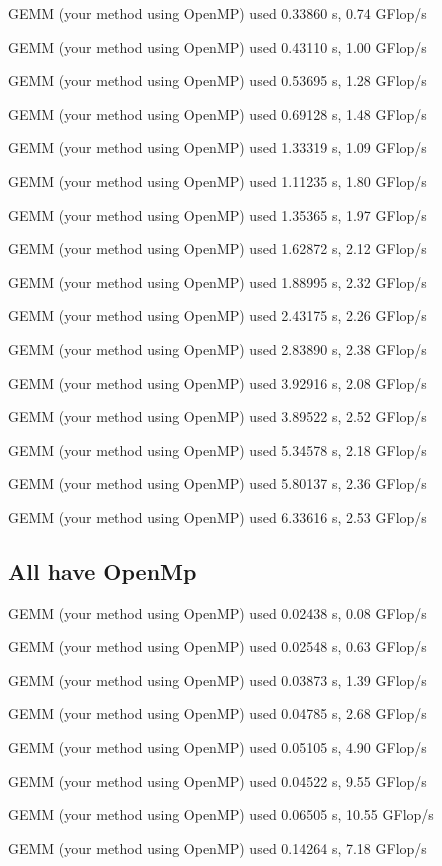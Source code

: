 \documentclass[12pt]{article}
\begin{document}
GEMM (your method using OpenMP) used 0.33860 s, 0.74 GFlop/s

GEMM (your method using OpenMP) used 0.43110 s, 1.00 GFlop/s

GEMM (your method using OpenMP) used 0.53695 s, 1.28 GFlop/s

GEMM (your method using OpenMP) used 0.69128 s, 1.48 GFlop/s

GEMM (your method using OpenMP) used 1.33319 s, 1.09 GFlop/s

GEMM (your method using OpenMP) used 1.11235 s, 1.80 GFlop/s

GEMM (your method using OpenMP) used 1.35365 s, 1.97 GFlop/s

GEMM (your method using OpenMP) used 1.62872 s, 2.12 GFlop/s

GEMM (your method using OpenMP) used 1.88995 s, 2.32 GFlop/s

GEMM (your method using OpenMP) used 2.43175 s, 2.26 GFlop/s

GEMM (your method using OpenMP) used 2.83890 s, 2.38 GFlop/s

GEMM (your method using OpenMP) used 3.92916 s, 2.08 GFlop/s

GEMM (your method using OpenMP) used 3.89522 s, 2.52 GFlop/s

GEMM (your method using OpenMP) used 5.34578 s, 2.18 GFlop/s

GEMM (your method using OpenMP) used 5.80137 s, 2.36 GFlop/s

GEMM (your method using OpenMP) used 6.33616 s, 2.53 GFlop/s

\subsection{All have OpenMp}

GEMM (your method using OpenMP) used 0.02438 s, 0.08 GFlop/s

GEMM (your method using OpenMP) used 0.02548 s, 0.63 GFlop/s

GEMM (your method using OpenMP) used 0.03873 s, 1.39 GFlop/s

GEMM (your method using OpenMP) used 0.04785 s, 2.68 GFlop/s

GEMM (your method using OpenMP) used 0.05105 s, 4.90 GFlop/s

GEMM (your method using OpenMP) used 0.04522 s, 9.55 GFlop/s

GEMM (your method using OpenMP) used 0.06505 s, 10.55 GFlop/s

GEMM (your method using OpenMP) used 0.14264 s, 7.18 GFlop/s
\end{document}
